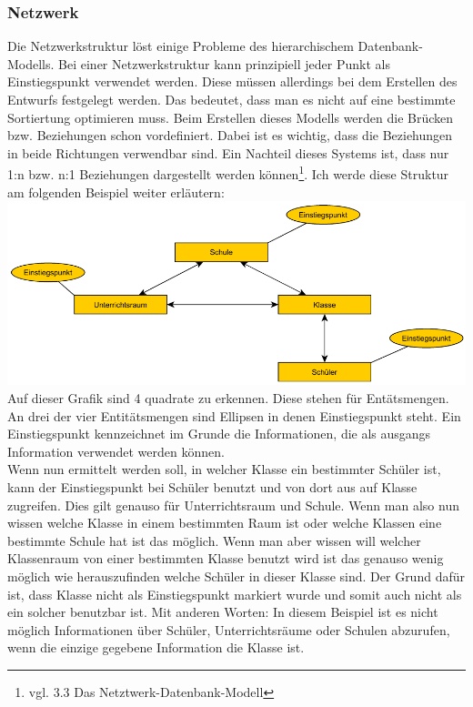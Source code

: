 \documentclass[a4paper, 12pt]{article}
\theoremstyle{plain}
\theoremstyle{definition}
\begin{document}
	\subsubsection{Netzwerk}
	\label{sec:netzdb}
	Die Netzwerkstruktur löst einige Probleme des hierarchischem Datenbank-Modells. Bei einer Netzwerkstruktur kann prinzipiell jeder Punkt als Einstiegspunkt verwendet werden. Diese müssen allerdings bei dem Erstellen des Entwurfs festgelegt werden. Das bedeutet, dass man es nicht auf eine bestimmte Sortiertung optimieren muss. Beim Erstellen dieses Modells werden die Brücken bzw. Beziehungen schon vordefiniert. Dabei ist es wichtig, dass die Beziehungen in beide Richtungen verwendbar sind. Ein Nachteil dieses Systems ist, dass nur 1:n bzw. n:1 Beziehungen dargestellt werden können\footnote{vgl. \cite{Jarosch2010} 3.3 Das Netztwerk-Datenbank-Modell}. Ich werde diese Struktur am folgenden Beispiel weiter erläutern: \\
\includegraphics[scale=1]{netzwerkmodell.pdf}	
Auf dieser Grafik sind 4 quadrate zu erkennen. Diese stehen für Entätsmengen. An drei der vier Entitätsmengen sind Ellipsen in denen Einstiegspunkt steht. Ein Einstiegspunkt kennzeichnet im Grunde die Informationen, die als ausgangs Information verwendet werden können. \\
Wenn nun ermittelt werden soll, in welcher Klasse ein bestimmter Schüler ist, kann der Einstiegspunkt bei Schüler benutzt und von dort aus auf Klasse zugreifen. Dies gilt genauso für Unterrichtsraum und Schule. Wenn man also nun wissen welche Klasse in einem bestimmten Raum ist oder welche Klassen eine bestimmte Schule hat ist das möglich. Wenn man aber wissen will welcher Klassenraum von einer bestimmten Klasse benutzt wird ist das genauso wenig möglich wie herauszufinden welche Schüler in dieser Klasse sind. Der Grund dafür ist, dass Klasse nicht als Einstiegspunkt markiert wurde und somit auch nicht als ein solcher benutzbar ist. Mit anderen Worten: In diesem Beispiel ist es nicht möglich Informationen über Schüler, Unterrichtsräume oder Schulen abzurufen, wenn die einzige gegebene Information die Klasse ist.
		
\end{document}
